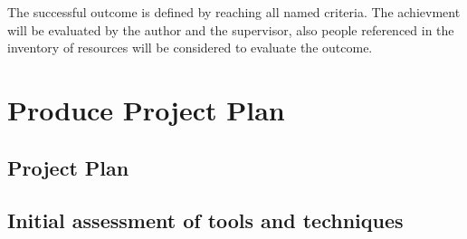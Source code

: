 The successful outcome is defined by reaching all named criteria. The achievment will be evaluated by the author and the supervisor, also people referenced in the inventory of resources will be considered to evaluate the outcome.


\section{Produce Project Plan}

\subsection{Project Plan}

\subsection{Initial assessment of tools and techniques}










